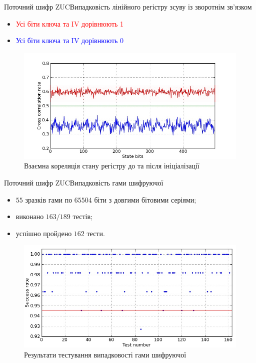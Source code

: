 \documentclass[10pt, ucs, handout]{beamer}
\begin{document}
\begin{frame}{Поточний шифр ZUC}{Випадковість лінійного регістру зсуву із зворотнім зв'язком}
    \begin{block}{}
        \begin{itemize}
            \item \textcolor{red}{Усі біти ключа та IV дорівнюють 1}
            \item \textcolor{blue}{Усі біти ключа та IV дорівнюють 0}
        \end{itemize}
    \end{block}
    \begin{figure}[htbp]
        \centering
        \includegraphics[scale=0.5]{correlation}
        \caption{Взаємна кореляція стану регістру до та після ініціалізації}
        \label{fig:corr}
    \end{figure}
\end{frame}

\begin{frame}{Поточний шифр ZUC}{Випадковість гами шифруючої}
    \begin{block}{}
        \begin{itemize}
            \item $55$ зразків гами по $65504$ біти з довгими бітовими серіями;
            \item виконано $163 / 189$ тестів;
            \item успішно пройдено $162$ тести.
        \end{itemize}
    \end{block}
    \begin{figure}[htbp]
        \centering
        \includegraphics[scale=0.5]{stats}
        \caption{Результати тестування випадковості гами шифруючої}
        \label{fig:corr}
    \end{figure}
\end{frame}
\end{document}
